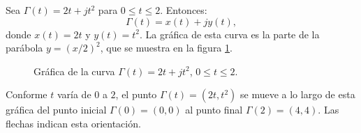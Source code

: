 \begin{example}
  Sea $\Gamma (t) = 2t + jt^2$ para $0\leqslant t\leqslant 2$. Entonces:
  $$
  \Gamma (t)=x(t)+jy(t),
  $$
  donde $x(t)=2t$ y $y(t)=t^2$. La gráfica de esta curva es la parte de la parábola $y=(x/2)^2$, que se muestra en la figura \ref{fig:ejemplo_parabola_gamma}.
  \begin{figure}[ht]
    \centering
    \caption{Gráfica de la curva $\Gamma (t) = 2t + jt^2$, $0\leqslant t\leqslant 2$.}
    \label{fig:ejemplo_parabola_gamma}
  \end{figure}
  Conforme $t$ varía de $0$ a $2$, el punto $\Gamma (t)=(2t,t^2)$ se mueve a lo largo de esta gráfica del punto inicial $\Gamma(0)=(0,0)$ al punto final $\Gamma(2)=(4,4)$. Las flechas indican esta orientación.
\end{example}
